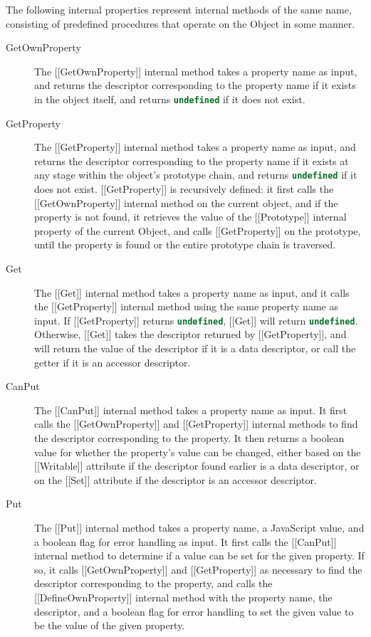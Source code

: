 \documentclass[a4paper,11pt,twoside]{report}
\def\jsinline{\lstinline[language=JavaScript, basicstyle=\small]}%\end{lstlisting}
\begin{document}
\noindent The following internal properties represent internal methods of the same name, consisting of predefined procedures that operate on the Object in some manner.
\begin{description}
\item[GetOwnProperty] The [[GetOwnProperty]] internal method takes a property name as input, and returns the descriptor corresponding to the property name if it exists in the object itself, and returns \jsinline|undefined| if it does not exist.

\item[GetProperty] The [[GetProperty]] internal method takes a property name as input, and returns the descriptor corresponding to the property name if it exists at any stage within the object's prototype chain, and returns \jsinline|undefined| if it does not exist. [[GetProperty]] is recursively defined: it first calls the [[GetOwnProperty]] internal method on the current object, and if the property is not found, it retrieves the value of the [[Prototype]] internal property of the current Object, and calls [[GetProperty]] on the prototype, until the property is found or the entire prototype chain is traversed.

\item[Get] The [[Get]] internal method takes a property name as input, and it calls the [[GetProperty]] internal method using the same property name as input. If [[GetProperty]] returns \jsinline|undefined|, [[Get]] will return \jsinline|undefined|. Otherwise, [[Get]] takes the descriptor returned by [[GetProperty]], and will return the value of the descriptor if it is a data descriptor, or call the getter if it is an accessor descriptor.

\item[CanPut] The [[CanPut]] internal method takes a property name as input. It first calls the [[GetOwnProperty]] and [[GetProperty]] internal methods to find the descriptor corresponding to the property. It then returns a boolean value for whether the property's value can be changed, either based on the [[Writable]] attribute if the descriptor found earlier is a data descriptor, or on the [[Set]] attribute if the descriptor is an accessor descriptor.

\item[Put] The [[Put]] internal method takes a property name, a JavaScript value, and a boolean flag for error handling as input. It first calls the [[CanPut]] internal method to determine if a value can be set for the given property. If so, it calls [[GetOwnProperty]] and [[GetProperty]] as necessary to find the descriptor corresponding to the property, and calls the [[DefineOwnProperty]] internal method with the property name, the descriptor, and a boolean flag for error handling to set the given value to be the value of the given property.


\end{description}
\end{document}
